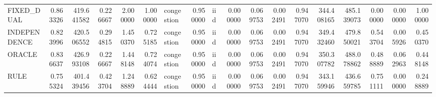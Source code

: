 \begin{tabular}{lrrrrrlrlrrrrrrrrr}
FIXED\_DUAL & 0.863326 & 419.641582 & 0.226667 & 2.000000 & 1.000000 & congestion & 0.950000 & iid & 0.000000 & 0.069753 & 0.002491 & 0.947070 & 344.408165 & 485.139073 & 0.000000 & 0.000000 & 1.000000 \\
INDEPENDENCE & 0.823996 & 420.506552 & 0.294815 & 1.450370 & 0.725185 & congestion & 0.950000 & iid & 0.000000 & 0.069753 & 0.002491 & 0.947070 & 349.432460 & 479.850021 & 0.543704 & 0.005926 & 0.450370 \\
ORACLE & 0.836637 & 426.993108 & 0.226667 & 1.448148 & 0.724074 & congestion & 0.950000 & iid & 0.000000 & 0.069753 & 0.002491 & 0.947070 & 350.307782 & 488.078862 & 0.488889 & 0.062963 & 0.448148 \\
RULE & 0.755324 & 401.439456 & 0.423704 & 1.248889 & 0.624444 & congestion & 0.950000 & iid & 0.000000 & 0.069753 & 0.002491 & 0.947070 & 343.159946 & 436.659785 & 0.751111 & 0.000000 & 0.248889 \\
\bottomrule
\end{tabular}
